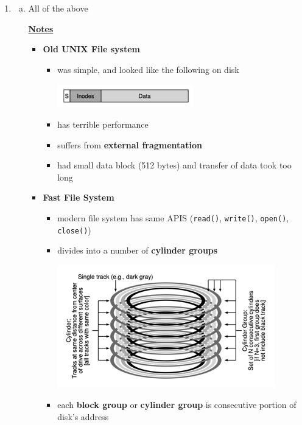 \documentclass[12pt]{article}
\begin{document}
\begin{enumerate}[1.]
    \item

    \bigskip

    \begin{enumerate}[a)]
        \item

        All of the above

        \bigskip

        \underline{\textbf{Notes}}

        \begin{itemize}
            \item \textbf{Old UNIX File system}
            \begin{itemize}
                \item was simple, and looked like the following on disk

                \begin{center}
                \includegraphics[width=0.6\linewidth]{images/midterm_1_solution_16.png}
                \end{center}
                \item has terrible performance
                \item suffers from \textbf{external fragmentation}
                \item had small data block (512 bytes) and transfer of data took too long
            \end{itemize}

            \item \textbf{Fast File System}

            \begin{itemize}
                \item modern file system has same APIS (\texttt{read()}, \texttt{write()}, \texttt{open()}, \texttt{close()})
                \item divides into a number of \textbf{cylinder groups}

                \begin{center}
                \includegraphics[width=0.8\linewidth]{images/midterm_1_solution_17.png}
                \end{center}
                \item each \textbf{block group} or \textbf{cylinder group} is consecutive
                portion of disk's address


\end{itemize}
\end{itemize}
\end{enumerate}
\end{enumerate}
\end{document}
